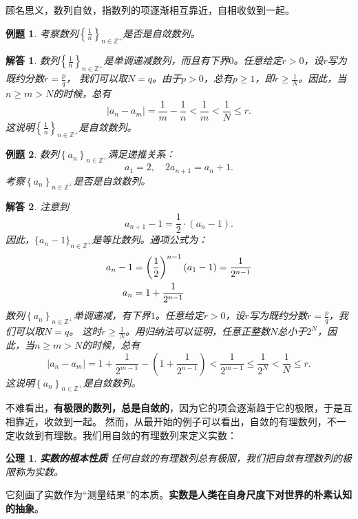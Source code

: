 \documentclass[12pt,UTF8]{ctexbook}
\newtheorem{et}{例题}[section]
\newtheorem*{po}{公理}
\newtheorem*{so}{解答}
\begin{document}
顾名思义，数列自敛，指数列的项逐渐相互靠近，自相收敛到一起。

\begin{et} 
    考察数列$\left\{\frac{1}{n}\right\}_{n\in\mathbb{Z}^+}$是否是自敛数列。\\
\end{et}
\begin{so}
    数列$\left\{\frac{1}{n}\right\}_{n\in\mathbb{Z}^+}$是单调递减数列，而且有下界$0$。任意给定$r>0$，设$r$写为既约分数$r = \frac{p}{q}$，
    我们可以取$N = q$。由于$p > 0$，总有$p \geqslant 1$，即$r \geqslant \frac{1}{N}$。因此，当$n\geqslant m>N$的时候，总有
    $$|a_n - a_m| = \frac{1}{m} - \frac{1}{n} < \frac{1}{m} < \frac{1}{N} \leqslant r.$$
    这说明$\left\{\frac{1}{n}\right\}_{n\in\mathbb{Z}^+}$是自敛数列。
\end{so}
\begin{et} 
    数列$\left\{a_n\right\}_{n\in\mathbb{Z}^+}$满足递推关系：
    $$a_1 = 2, \quad 2a_{n+1} = a_n + 1.$$
    \indent 考察$\left\{a_n\right\}_{n\in\mathbb{Z}^+}$是否是自敛数列。\\
\end{et}
\begin{so}
    注意到
    $$ a_{n+1} - 1 = \frac{1}{2}\cdot (a_n - 1). $$
    因此，$\{a_n - 1\}_{n\in\mathbb{Z}^+}$是等比数列。通项公式为：
    \begin{align}
        a_n - 1 &= \left(\frac12\right)^{n-1} (a_1 - 1) = \frac{1}{2^{n-1}} \notag \\
        a_n &= 1 + \frac{1}{2^{n-1}} \notag
    \end{align}
    数列$\left\{a_n\right\}_{n\in\mathbb{Z}^+}$单调递减，有下界$1$。任意给定$r>0$，设$r$写为既约分数$r = \frac{p}{q}$，我们可以取$N = q$。
    这时$r \geqslant \frac{1}{N}$。用归纳法可以证明，任意正整数$N$总小于$2^N$，因此，当$n\geqslant m>N$的时候，总有
    $$|a_n - a_m| = 1 + \frac{1}{2^{m-1}} - \left(1 + \frac{1}{2^{n-1}} \right) < \frac{1}{2^{m-1}} \leqslant \frac{1}{2^N} < \frac{1}{N} \leqslant r.$$
    这说明$\left\{a_n\right\}_{n\in\mathbb{Z}^+}$是自敛数列。
\end{so}

不难看出，\textbf{有极限的数列，总是自敛的}，因为它的项会逐渐趋于它的极限，于是互相靠近，收敛到一起。
然而，从最开始的例子可以看出，自敛的有理数列，不一定收敛到有理数。我们用自敛的有理数列来定义实数：
\begin{po}\textbf{实数的根本性质}
    任何自敛的有理数列总有极限，我们把自敛有理数列的极限称为实数。
\end{po}
它刻画了实数作为“测量结果”的本质。\textbf{实数是人类在自身尺度下对世界的朴素认知的抽象}。
\end{document}
